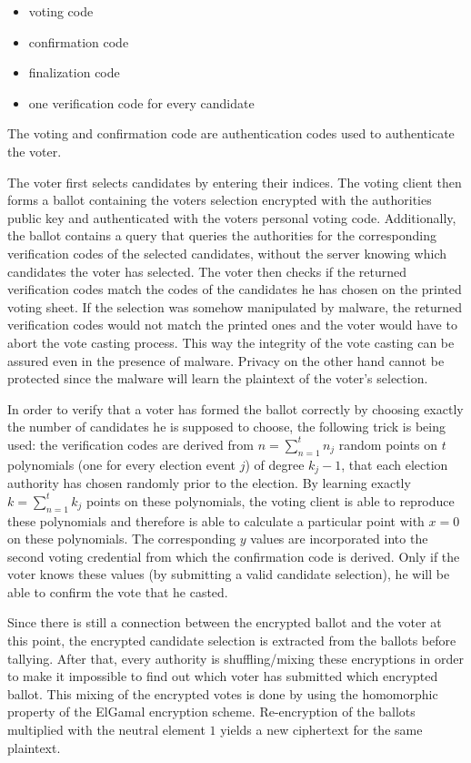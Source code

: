 \begin{itemize}
	\item voting code
	\item confirmation code
	\item finalization code
	\item one verification code for every candidate
\end{itemize}

The voting and confirmation code are authentication codes used to authenticate the voter.

The voter first selects candidates by entering their indices. The voting client then forms a ballot containing the voters selection encrypted with the authorities public key and authenticated with the voters personal voting code. Additionally, the ballot contains a query that queries the authorities for the corresponding verification codes of the selected candidates, without the server knowing which candidates the voter has selected. The voter then checks if the returned verification codes match the codes of the candidates he has chosen on the printed voting sheet. If the selection was somehow manipulated by malware, the returned verification codes would not match the printed ones and the voter would have to abort the vote casting process. This way the integrity of the vote casting can be assured even in the presence of malware. Privacy on the other hand cannot be protected since the malware will learn the plaintext of the voter's selection.

In order to verify that a voter has formed the ballot correctly by choosing exactly the number of candidates he is supposed to choose, the following trick is being used: the verification codes are derived from $n = \sum_{n=1}^{t} n_j$ random points on $t$ polynomials (one for every election event $j$) of degree $k_j - 1$, that each election authority has chosen randomly prior to the election. By learning exactly $k = \sum_{n=1}^{t} k_j$ points on these polynomials, the voting client is able to reproduce these polynomials and therefore is able to calculate a particular point with $x=0$ on these polynomials. The corresponding $y$ values are incorporated into the second voting credential from which the confirmation code is derived. Only if the voter knows these values (by submitting a valid candidate selection), he will be able to confirm the vote that he casted.

Since there is still a connection between the encrypted ballot and the voter at this point, the encrypted candidate selection is extracted from the ballots before tallying. After that, every authority is shuffling/mixing these encryptions in order to make it impossible to find out which voter has submitted which encrypted ballot. This mixing of the encrypted votes is done by using the homomorphic property of the ElGamal encryption scheme. Re-encryption of the ballots multiplied with the neutral element $1$ yields a new ciphertext for the same plaintext.

